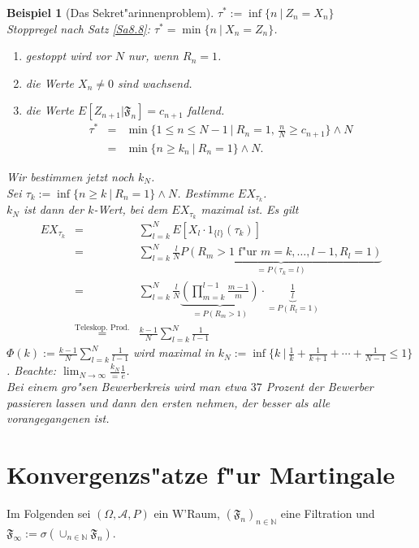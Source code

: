 \documentclass[a4paper,11pt]{scrbook}
\newcommand{\N}{{\mathbb N}}
\def\AA{ \mathcal{A} }
\def\FF{ \mathfrak{F} }
\newtheorem{Bsp}{Beispiel}[chapter]
\theoremstyle{nonumberplain}
\begin{document}
\begin{Bsp}[Das Sekret"arinnenproblem]
$\tau^{\ast} := \inf\{ n\ |\ Z_n = X_n\}$\\
Stoppregel nach Satz \ref{Sa8.8}: $\tau^{\ast} = \min \{n\ |\ X_n = Z_n\}$.
\begin{enumerate}
\item[$\bullet$] gestoppt wird vor $N$ nur, wenn $R_n=1$.

\item[$\bullet$] die Werte $X_n \not= 0$ sind wachsend.

\item[$\bullet$] die Werte $E[Z_{n+1} | \FF_n] = c_{n+1}$ fallend.
\begin{eqnarray*}
\tau^{\ast} & = & \min\{ 1 \leq n \leq N-1\ |\ R_n = 1,\, \frac{n}{N} \geq c_{n+1}\} \wedge N \\
& = & \min\{ n \geq k_n\ |\ R_n = 1 \} \wedge N.
\end{eqnarray*}
\end{enumerate}

Wir bestimmen jetzt noch $k_N$.\\
Sei $\tau_{k} := \inf\{ n \geq k\ |\ R_n=1\} \wedge N$. Bestimme $EX_{\tau_k}$.\\
$k_N$ ist dann der $k$-Wert, bei dem $EX_{\tau_k}$ maximal ist. Es gilt
\begin{eqnarray*}
EX_{\tau_k} & = & \sum_{l=k}^N E[X_l \cdot 1_{\{l\}} (\tau_k)] \\
& = & \sum_{l=k}^N \frac{l}{N} \underbrace{ P(R_m>1 \text{ f"ur } m=k,\dots,l-1,R_l = 1) }_{=P(\tau_k = l)} \\
& = & \sum_{l=k}^N \frac{l}{N} \underbrace{ \left( \prod_{m=k}^{l-1} \frac{m-1}{m} \right)}_{=P(R_m>1)} \cdot \underbrace{\frac1{l}}_{=P(R_l=1)} \\
& \stackrel{\text{Teleskop. Prod.}}{=} & \frac{k-1}{N} \sum_{l=k}^N \frac1{l-1}
\end{eqnarray*}
$\Phi(k) := \frac{k-1}{N} \sum_{l=k}^N \frac1{l-1}$ wird maximal in $k_N := \inf\{ k\ |\ \frac1{k} + \frac1{k+1} + \cdots + \frac1{N-1} \leq 1\}$. Beachte: $\lim_{N \rightarrow \infty} \frac{k_N} = \frac1{e}$.\\
Bei einem gro"sen Bewerberkreis wird man etwa $37$ Prozent der Bewerber passieren lassen und dann den ersten nehmen, der besser als alle vorangegangenen ist.
\end{Bsp}


\chapter{Konvergenzs"atze f"ur Martingale}
Im Folgenden sei $(\Omega,\AA,P)$ ein W'Raum, $(\FF_n)_{n \in \N}$ eine Filtration und $\FF_{\infty} := \sigma(\cup_{n \in \N} \FF_n)$.
\end{document}
